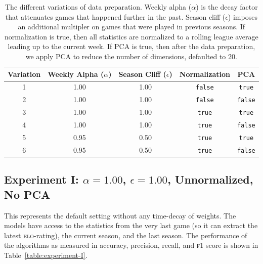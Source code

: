 \documentclass[10pt]{article}
\begin{document}
\begin{table}[htbp]
\centering
\begin{tabular}{|c|c|c|c|c|}
\hline
Variation & Weekly Alpha ($\alpha$) & Season Cliff ($\epsilon$) & Normalization & PCA \\ \hline
1 & 1.00 & 1.00 & \texttt{false} & \texttt{true} \\
2 & 1.00 & 1.00 & \texttt{false} & \texttt{false} \\
3 & 1.00 & 1.00 & \texttt{true} & \texttt{true} \\
4 & 1.00 & 1.00 & \texttt{true} & \texttt{false} \\
5 & 0.95 & 0.50 & \texttt{true} & \texttt{true} \\
6 & 0.95 & 0.50 & \texttt{true} & \texttt{false} \\
\hline
\end{tabular}
\caption{The different variations of data preparation. Weekly alpha
($\alpha$) is the decay factor
that attenuates games that happened further in the past. Season cliff ($\epsilon$) imposes an
additional multipler on games that were played in previous seasons. If normalization is
true, then all statistics are normalized to a rolling league average leading up to the
current week. If PCA is true, then after the data preparation, we apply PCA to reduce the
number of dimensions, defaulted to $20$.}
\label{table:variations}
\end{table}

\subsection{Experiment I: $\alpha=1.00$, $\epsilon = 1.00$, Unnormalized, No PCA}

This represents the default setting without any time-decay of weights. The models have
access to the statistics from the very last game (so it can extract the latest \textsc{elo}-rating),
the current season, and the last season. The performance of the algorithms as measured
in accuracy, precision, recall, and \textsc{f1} score is shown in Table~\ref{table:experiment-I}.
\end{document}
